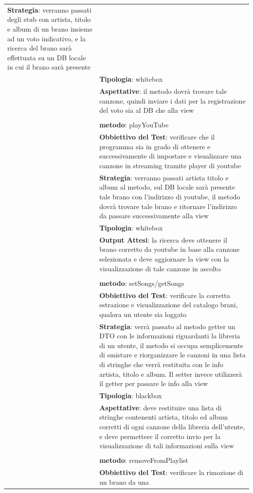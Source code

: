 \begin{footnotesize}
\begin{longtable}{|p{5.7cm}|p{10.3cm}|}
\textbf{Strategia}: verranno passati degli stub con artista, titolo e album di
un brano insieme ad un voto indicativo, e la ricerca del brano sar\`a
effettuata su un DB locale in cui il brano sar\`a presente\\&
\textbf{Tipologia}: whitebox\\&
\textbf{Aspettative}: il metodo dovr\`a trovare tale canzone, quindi inviare i
dati per la registrazione del voto sia al DB che alla view\\&
\\&
\textbf{metodo}: playYouTube\\&
\textbf{Obbiettivo del Test}: verificare che il
programma sia in grado di ottenere e successivamente di impostare e visualizzare una canzone in streaming tramite
player di youtube\\&
\textbf{Strategia}: verranno passati artista titolo e album al metodo, sul DB
locale sar\`a presente tale brano con l'indirizzo di youtube, il metodo
dovr\`a trovare tale brano e ritornare l'indirizzo da passare successivamente
alla view\\&
\textbf{Tipologia}: whitebox\\&
\textbf{Output Attesi}: la ricerca deve ottenere il brano corretto
da youtube in base alla canzone selezionata e deve aggiornare la view con la
visualizzazione di tale canzone in ascolto \\& 
\\&
\textbf{metodo}: setSongs/getSongs\\&
\textbf{Obbiettivo del Test}: verificare la corretta estrazione e visualizzazione del
catalogo brani, qualora un utente sia loggato\\& 
\textbf{Strategia}: verr\`a passato al metodo getter un DTO con le informazioni
riguardanti la libreria di un utente, il metodo si occupa semplicemente di
smistare e riorganizzare le canzoni in una lista di stringhe che verr\`a
restituita con le info artista, titolo e album. Il setter invece utilizzer\`a
il getter per passare le info alla view\\&
\textbf{Tipologia}: blackbox\\&
\textbf{Aspettative}: deve
restituire una lista di stringhe contenenti artista, titolo ed album corretti di
ogni canzone della libreria dell'utente, e deve permettere il corretto invio per
la visualizzazione di tali informazioni sulla view\\&
\\&
\textbf{metodo}: removeFromPlaylist\\&
\textbf{Obbiettivo del Test}: verificare la rimozione di un brano da una

\end{longtable}
\end{footnotesize}
